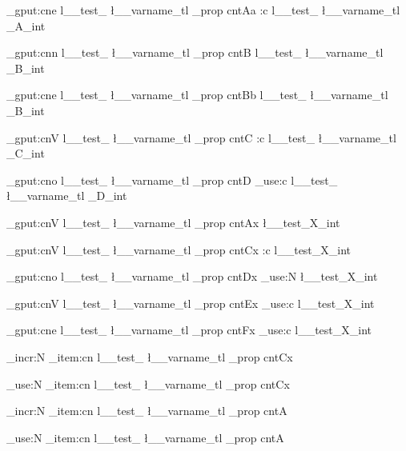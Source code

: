 \documentclass{article}
\begin{document}
\prop_gput:cne {l__test_ \l__varname_tl _prop} {cntAa} {\use:c {l__test_ \l__varname_tl _A_int}}


\prop_gput:cnn {l__test_ \l__varname_tl _prop} {cntB} {l__test_ \l__varname_tl _B_int}

\prop_gput:cne {l__test_ \l__varname_tl _prop} {cntBb} {l__test_ \l__varname_tl _B_int}


\prop_gput:cnV {l__test_ \l__varname_tl _prop} {cntC} {\use:c {l__test_ \l__varname_tl _C_int}}


\prop_gput:cno {l__test_ \l__varname_tl _prop} {cntD} {\int_use:c {l__test_ \l__varname_tl _D_int}}

\prop_gput:cnV {l__test_ \l__varname_tl _prop} {cntAx} {\l__test_X_int}

\prop_gput:cnV {l__test_ \l__varname_tl _prop} {cntCx} {\use:c {l__test_X_int}}

\prop_gput:cno {l__test_ \l__varname_tl _prop} {cntDx} {\int_use:N \l__test_X_int}

\prop_gput:cnV {l__test_ \l__varname_tl _prop} {cntEx} {\int_use:c {l__test_X_int}}

\prop_gput:cne {l__test_ \l__varname_tl _prop} {cntFx} {\int_use:c {l__test_X_int}}

\int_incr:N {\prop_item:cn {l__test_ \l__varname_tl _prop} {cntCx}}

\int_use:N \prop_item:cn {l__test_ \l__varname_tl _prop} {cntCx}

\par

\int_incr:N {\prop_item:cn {l__test_ \l__varname_tl _prop} {cntA}}

\int_use:N \prop_item:cn {l__test_ \l__varname_tl _prop} {cntA}
\end{document}
